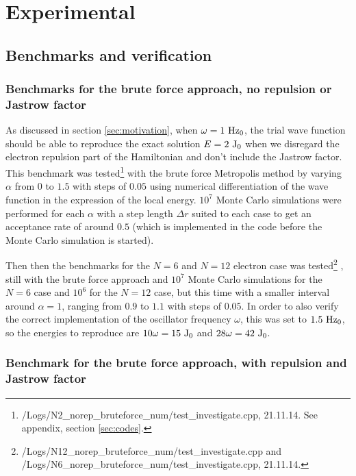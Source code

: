 \section{Experimental}

\subsection{Benchmarks and verification} \label{sec:exp_benchmarks}

\subsubsection{Benchmarks for the brute force approach, no repulsion or Jastrow factor}
As discussed in section \ref{sec:motivation}, when $\omega = 1 ~\textrm{Hz}_0$, the trial wave function should be able to reproduce the exact solution $E=2 ~\textrm{J}_0$ when we disregard the electron repulsion part of the Hamiltonian and don't include the Jastrow factor. 
This benchmark was tested\footnote{/Logs/N2\_norep\_bruteforce\_num/test\_investigate.cpp, 21.11.14. See appendix, section \ref{sec:codes}.}
with the brute force Metropolis method by varying $\alpha$ from $0$ to $1.5$ with steps of $0.05$ using numerical differentiation of the wave function in the expression of the local energy. 
$10^7$ Monte Carlo simulations were performed for each $\alpha$ with a step length $\Delta r$ suited to each case to get an acceptance rate of around $0.5$ (which is implemented in the code before the Monte Carlo simulation is started).

Then then the benchmarks for the $N=6$ and $N=12$ electron case was tested\footnote{/Logs/N12\_norep\_bruteforce\_num/test\_investigate.cpp and /Logs/N6\_norep\_bruteforce\_num/test\_investigate.cpp, 21.11.14. }
, still with the brute force approach and $10^7$ Monte Carlo simulations for the $N=6$ case and $10^6$ for the $N=12$ case, but this time with a smaller interval around $\alpha=1$, ranging from $0.9$ to $1.1$ with steps of $0.05$. 
In order to also verify the correct implementation of the oscillator frequency $\omega$, this was set to $1.5 ~\textrm{Hz}_0$, so the energies to reproduce are $10 \omega = 15 ~\textrm{J}_0$ and $28 \omega = 42 ~\textrm{J}_0$. 

\subsubsection{Benchmark for the brute force approach, with repulsion and Jastrow factor} \label{sec:exp_N2rep}

